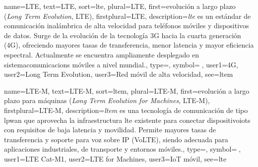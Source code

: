 	{
		name={LTE},
		text={LTE},
		sort={lte},
		plural={LTE},
		first={evoluci{\'o}n a largo plazo (\textit{Long Term Evolution}, LTE)},
		firstplural={LTE},
		description={\emph{\gls{lte}} es un est{\'a}ndar de comunicaci{\'o}n inal{\'a}mbrica de alta velocidad para tel{\'e}fonos m{\'o}viles y \glspl{dispositivo} de datos. Surge de la evoluci{\'o}n de la tecnolog{\'i}a 3G hacia la cuarta generaci{\'o}n (4G), ofreciendo mayores tasas de transferencia, menor \gls{latencia} y mayor eficiencia espectral. Actualmente se encuentra ampliamente desplegado en \glspl{sistemacomunicacion} m{\'o}viles a nivel mundial.},
		type=\glsdefaulttype,
		symbol={📶},
		user1={4G},
		user2={Long Term Evolution},
		user3={Red m{\'o}vil de alta velocidad},
		see={ltem}
	}
	
	{
		name={LTE-M},
		text={LTE-M},
		sort={ltem},
		plural={LTE-M},
		first={evoluci{\'o}n a largo plazo para m{\'a}quinas (\textit{Long Term Evolution for Machines}, LTE-M)},
		firstplural={LTE-M},
		description={\emph{\gls{ltem}} es una tecnolog{\'i}a de comunicaci{\'o}n de tipo \gls{lpwan} que aprovecha la infraestructura \gls{lte} existente para conectar \glspl{dispositivoiot} con requisitos de baja \gls{latencia} y movilidad. Permite mayores tasas de transferencia y soporte para voz sobre IP (VoLTE), siendo adecuada para aplicaciones industriales, de transporte y entornos m{\'o}viles.},
		type=\glsdefaulttype,
		symbol={📲},
		user1={LTE Cat-M1},
		user2={LTE for Machines},
		user3={IoT m{\'o}vil},
		see={lte}
	}
	
	
